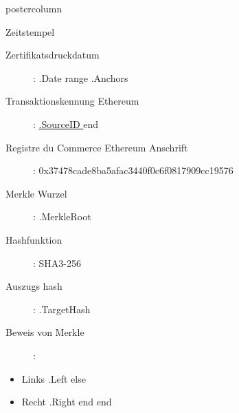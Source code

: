 \documentclass[roundedcorners=true, titleposition=center]{beamerthemeruhuisstijlposter}
\begin{document}
\begin{frame}
\begin{columns}
\begin{column}{0.95\textwidth}
\begin{beamercolorbox}[center, wd=\textwidth]{postercolumn}
\begin{minipage}[T]{0.95\textwidth}
    \hfill
\parbox[t][\columnheight]{\textwidth}{%

\begin{block}{Zeitstempel}
\begin{description}
    \item [Zertifikatsdruckdatum] :\linebreak
{{ .Date }}
{{ range .Anchors }}
\item [Transaktionskennung Ethereum] :\linebreak
\href{https://etherscan.io/tx/0x{{ .SourceID }} }{ {{.SourceID }} }
{{ end }}
\item[Registre du Commerce Ethereum Anschrift] :\linebreak
0x37478cade8ba5afac3440f0c6f0817909cc19576
\item[Merkle Wurzel] :\linebreak
{{ .MerkleRoot }}
\item[Hashfunktion] : \linebreak
SHA3-256
\item[Auszugs hash] :\linebreak
{{ .TargetHash }}
\item[Beweis von Merkle] :
\end{description}
\begin{itemize}
{{ range .Proof }}
    {{ if .Left }}
        \item Links {{ .Left }}
    {{ else }}
        \item Recht {{ .Right }}
    {{ end }}
{{ end }}
\end{itemize}
\end{block}
}
\end{minipage}
\end{beamercolorbox}
\end{column}
\end{columns}
\end{frame}
\end{document}
